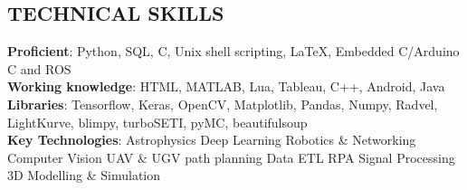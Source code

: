 \documentclass[11pt]{res} %
\newcommand{\titlegap}{5pt} %
\newcommand{\sectgap}{0.05in} %
\begin{document}
\begin{resume}











\section{TECHNICAL SKILLS}

\vspace{0.1in} 

\textbf{Proficient}: Python, SQL, C, Unix shell scripting, \LaTeX, Embedded C/Arduino C and ROS\vspace{0.05in}\\
\textbf{Working knowledge}: HTML, MATLAB, Lua, Tableau, C++, Android, Java
\vspace{0.05in}\\
\textbf{Libraries}: Tensorflow, Keras, OpenCV, Matplotlib, Pandas, Numpy, Radvel, LightKurve, blimpy, turboSETI, pyMC, beautifulsoup
\vspace{0.05in}\\
\textbf{Key Technologies}: \textbullet{} Astrophysics \textbullet{} Deep Learning \textbullet{} Robotics \& Networking \textbullet{} Computer Vision \textbullet{} UAV \& UGV path planning \textbullet{} Data ETL \textbullet{} RPA \textbullet{} Signal Processing \textbullet{} 3D Modelling \& Simulation


\end{resume}
\end{document}
